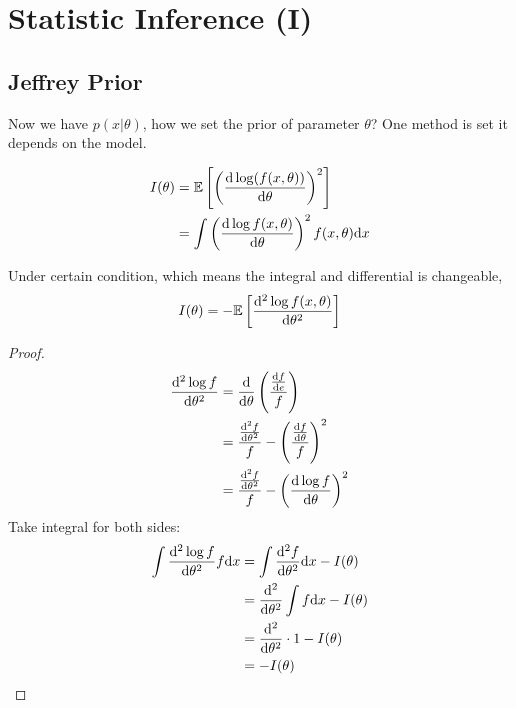 \chapter{Statistic Inference (I)}

\section{Jeffrey Prior}
Now we have $p(x|\theta)$, how we set the prior of parameter $\theta$? One method is set it depends on the model.

\begin{definition}
	\begin{align*}
		I(\theta)&=\mathbb{E}\left[\left(\frac{\mathrm{d} \log (f(x,\theta))}{\mathrm{d} \theta}\right)^2\right]\\
		&= \int \left(\frac{\mathrm{d} \log f(x,\theta)}{\mathrm{d} \theta}\right)^2f(x,\theta)\mathrm{d} x
	\end{align*}
\end{definition}

\begin{lemma}
	Under certain condition, which means the integral and differential is changeable, 
	$$I(\theta)=-\mathbb{E}\left[\frac{\mathrm{d}^2 \log f(x,\theta)}{\mathrm{d} \theta^2}\right]$$
\end{lemma}
\begin{proof}
	\begin{align*}
		\frac{\mathrm{d}^2 \log f}{\mathrm{d} \theta^2} &=\frac{\mathrm{d}}{\mathrm{d}\theta}\left(\frac{\frac{\mathrm{d} f}{\mathrm{d} e}}{f}\right) \\
		&= \frac{\frac{\mathrm{d}^2 f}{\mathrm{d} \theta^2}}{f}-\left(\frac{\frac{\mathrm{d} f}{\mathrm{d} \theta}}{f}\right)^2\\
		&=\frac{\frac{\mathrm{d}^2 f}{\mathrm{d} \theta^2}}{f} - \left(\frac{\mathrm{d} \log f}{\mathrm{d}\theta}\right)^2
	\end{align*}
Take integral for both sides:
	\begin{align*}
		\int \frac{\mathrm{d}^2\log f}{\mathrm{d}\theta^2}f\mathrm{d} x &= \int \frac{\mathrm{d} ^2 f}{\mathrm{d} \theta^2}\mathrm{d} x-I(\theta)\\
		&= \frac{\mathrm{d}^2}{\mathrm{d}\theta^2}\int f\mathrm{d} x-I(\theta)\\
		&= \frac{\mathrm{d}^2}{\mathrm{d} \theta^2}\cdot 1 - I(\theta)\\
		&= -I(\theta)
	\end{align*}
\end{proof}

